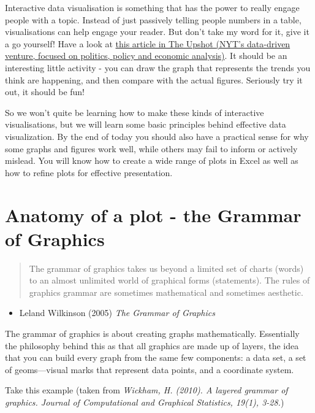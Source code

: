\documentclass[]{book}
\providecommand{\tightlist}{%
  \setlength{\itemsep}{0pt}\setlength{\parskip}{0pt}}
\theoremstyle{definition}
\theoremstyle{definition}
\theoremstyle{definition}
\theoremstyle{remark}
\begin{document}
Interactive data visualisation is something that has the power to really
engage people with a topic. Instead of just passively telling people
numbers in a table, visualisations can help engage your reader. But
don't take my word for it, give it a go yourself! Have a look at
\href{https://www.nytimes.com/interactive/2017/04/14/upshot/drug-overdose-epidemic-you-draw-it.html}{this
article in The Upshot (NYT's data-driven venture, focused on politics,
policy and economic analysis)}. It should be an interesting little
activity - you can draw the graph that represents the trends you think
are happening, and then compare with the actual figures. Seriously try
it out, it should be fun!

So we won't quite be learning how to make these kinds of interactive
visualisations, but we will learn some basic principles behind effective
data visualization. By the end of today you should also have a practical
sense for why some graphs and figures work well, while others may fail
to inform or actively mislead. You will know how to create a wide range
of plots in Excel as well as how to refine plots for effective
presentation.

\hypertarget{anatomy-of-a-plot---the-grammar-of-graphics}{%
\section{Anatomy of a plot - the Grammar of
Graphics}\label{anatomy-of-a-plot---the-grammar-of-graphics}}

\begin{quote}
The grammar of graphics takes us beyond a limited set of charts (words)
to an almost unlimited world of graphical forms (statements). The rules
of graphics grammar are sometimes mathematical and sometimes aesthetic.
\end{quote}

\begin{itemize}
\tightlist
\item
  Leland Wilkinson (2005) \emph{The Grammar of Graphics}
\end{itemize}

The grammar of graphics is about creating graphs mathematically.
Essentially the philosophy behind this as that all graphics are made up
of layers, the idea that you can build every graph from the same few
components: a data set, a set of geoms---visual marks that represent
data points, and a coordinate system.

Take this example (taken from \emph{Wickham, H. (2010). A layered
grammar of graphics. Journal of Computational and Graphical Statistics,
19(1), 3-28.})
\end{document}
